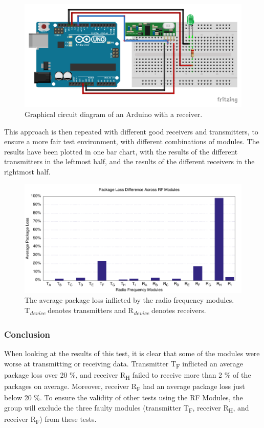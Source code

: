 \begin{figure}[h]
\centering
\includegraphics[width=\linewidth]{Figures/Fritzing/Receiver.pdf} 
\caption{Graphical circuit diagram of an Arduino with a receiver.}
\label{fig:Receiver}   
\end{figure}

This approach is then repeated with different good receivers and transmitters, to ensure a more fair test environment, with different combinations of modules.
The results have been plotted in one bar chart, with the results of the different transmitters in the leftmost half, and the results of the different receivers in the rightmost half.

\begin{figure}[H]
\centering
\includegraphics[width=\linewidth]{Figures/Graphs/diff_graph.pdf}
\centering
\caption{The average package loss inflicted by the radio frequency modules.\\ \textsf{T}\textsubscript{\textit{device}} denotes transmitters and \textsf{R}\textsubscript{\textit{device}} denotes receivers.}    
\label{fig:trans_diff}       
\end{figure} 

\subsubsection*{Conclusion}
When looking at the results of this test, it is clear that some of the modules were worse at transmitting or receiving data.
Transmitter \textsf{T\textsubscript{F}} inflicted an average package loss over 20 \%, and receiver \textsf{R\textsubscript{H}} failed to receive more than 2 \% of the packages on average.
Moreover, receiver \textsf{R\textsubscript{F}} had an average package loss just below 20 \%.
To ensure the validity of other tests using the RF Modules, the group will exclude the three faulty modules (transmitter \textsf{T\textsubscript{F}}, receiver \textsf{R\textsubscript{H}}, and receiver \textsf{R\textsubscript{F}}) from these tests.
